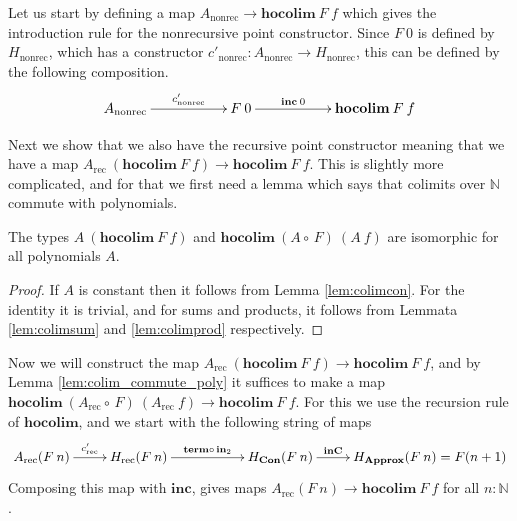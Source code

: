 \documentclass[a4paper,UKenglish]{lipics-v2016}
\newcommand{\Boperator}[1]{\mathrm{\mathbf{#1}}}
\newcommand{\inn}{\Boperator{in}}
\newcommand{\comp}[0]{\circ \,}
\newcommand{\rec}[0]{\operatorname{rec}}
\newcommand{\nonrec}[0]{\operatorname{nonrec}}
\newcommand{\term}[0]{\textbf{term}}
\newcommand{\Con}[0]{\textbf{Con}}
\newcommand{\Approx}[0]{\textbf{Approx}}
\newcommand{\inC}[0]{\Boperator{inC}}
\newcommand{\hocolim}[0]{\Boperator{hocolim}}
\newcommand{\inc}[0]{\Boperator{inc}}
\begin{document}
Let us start by defining a map $A_{\nonrec} \rightarrow \hocolim \> F \> f$ which gives the introduction rule for the nonrecursive point constructor.
Since $F \> 0$ is defined by $H_{\nonrec}$, which has a constructor $c'_{\nonrec} : A_{\nonrec} \rightarrow H_{\nonrec}$, this can be defined by the following composition.
\[
\xymatrix
{
        A_{\nonrec} \ar[rr]^-{c'_{\nonrec}}
                & & F \> 0 \ar[rr]^-{\inc \> 0}
                & & \hocolim \> F \> f
}
\]

Next we show that we also have the recursive point constructor meaning that we have a map $A_{\rec} \> (\hocolim \> F \> f) \rightarrow \hocolim \> F \> f$.
This is slightly more complicated, and for that we first need a lemma which says that colimits over $\mathbb{N}$ commute with polynomials.

\begin{lemma}
\label{lem:colim_commute_poly}
The types $A \> (\hocolim \> F \> f)$ and $\hocolim \> (A \comp F) \> (A \> f)$ are isomorphic for all polynomials $A$.
\end{lemma}

\begin{proof}
If $A$ is constant then it follows from Lemma \ref{lem:colimcon}.
For the identity it is trivial, and for sums and products, it follows from Lemmata \ref{lem:colimsum} and \ref{lem:colimprod} respectively. 
\end{proof}

Now we will construct the map $A_{\rec} \> (\hocolim \> F \> f) \rightarrow \hocolim \> F \> f$, and by Lemma \ref{lem:colim_commute_poly} it suffices to make a map $\hocolim \> (A_{\rec} \comp F) \> (A_{\rec} \> f) \rightarrow \hocolim \> F \> f$.
For this we use the recursion rule of $\hocolim$, and we start with the following string of maps
\[
\xymatrix
{
                A_{\rec}(F \> n) \ar[r]^-{c_{\rec}'} 
                & H_{\rec}(F \> n) \ar[rr]^-{\term \comp \inn_2} &
                & H_{\Con}(F \> n) \ar[r]^-{\inC}
                & H_{\Approx}(F \> n) = F(n + 1)
}
\]
Composing this map with $\inc$, gives maps $A_{\rec}(F \> n) \rightarrow \hocolim \> F \> f$ for all $n : \mathbb{N}$.
\end{document}
